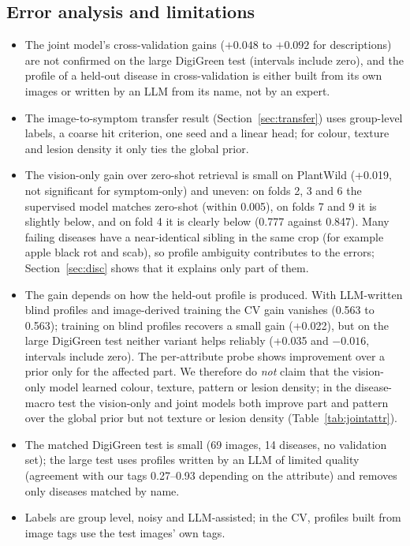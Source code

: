 \documentclass[11pt]{article}
\begin{document}
\subsection{Error analysis and limitations}\label{sec:limits}
\begin{itemize}
\item The joint model's cross-validation gains ($+0.048$ to $+0.092$ for descriptions) are not confirmed on the large DigiGreen test (intervals include zero), and the profile of a held-out disease in cross-validation is either built from its own images or written by an LLM from its name, not by an expert.
\item The image-to-symptom transfer result (Section~\ref{sec:transfer}) uses group-level labels, a coarse hit criterion, one seed and a linear head; for colour, texture and lesion density it only ties the global prior.
\item The vision-only gain over zero-shot retrieval is small on PlantWild (+0.019, not significant for symptom-only) and uneven: on folds 2, 3 and 6 the supervised model matches zero-shot (within 0.005), on folds 7 and 9 it is slightly below, and on fold 4 it is clearly below (0.777 against 0.847). Many failing diseases have a near-identical sibling in the same crop (for example apple black rot and scab), so profile ambiguity contributes to the errors; Section~\ref{sec:disc} shows that it explains only part of them.
\item The gain depends on how the held-out profile is produced. With LLM-written blind profiles and image-derived training the CV gain vanishes (0.563 to 0.563); training on blind profiles recovers a small gain (+0.022), but on the large DigiGreen test neither variant helps reliably (+0.035 and $-0.016$, intervals include zero). The per-attribute probe shows improvement over a prior only for the affected part. We therefore do \emph{not} claim that the vision-only model learned colour, texture, pattern or lesion density; in the disease-macro test the vision-only and joint models both improve part and pattern over the global prior but not texture or lesion density (Table~\ref{tab:jointattr}).
\item The matched DigiGreen test is small (69 images, 14 diseases, no validation set); the large test uses profiles written by an LLM of limited quality (agreement with our tags 0.27--0.93 depending on the attribute) and removes only diseases matched by name.
\item Labels are group level, noisy and LLM-assisted; in the CV, profiles built from image tags use the test images' own tags.

\end{itemize}
\end{document}
